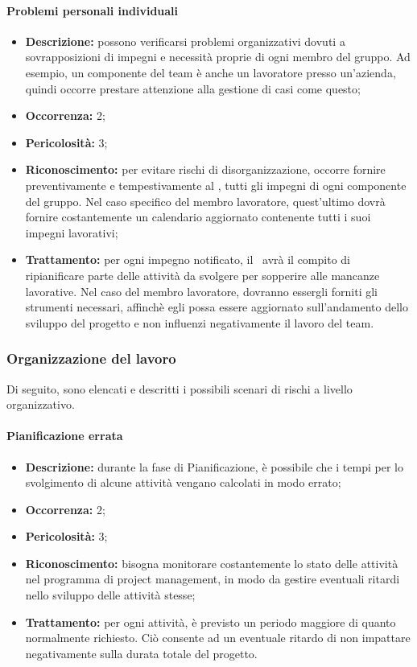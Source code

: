 \paragraph{Problemi personali individuali}
\begin{itemize}
	\item \textbf{Descrizione:} possono verificarsi problemi organizzativi dovuti a sovrapposizioni di impegni e necessità proprie di ogni membro del gruppo. Ad esempio, un componente del team è anche un lavoratore presso un'azienda, quindi occorre prestare attenzione alla gestione di casi come questo;
	\item \textbf{Occorrenza:} 2;
	\item \textbf{Pericolosità:} 3;
	\item \textbf{Riconoscimento:} per evitare rischi di disorganizzazione, occorre fornire preventivamente e tempestivamente al \textit{\Res}, tutti gli impegni di ogni componente del gruppo. Nel caso specifico del membro lavoratore, quest'ultimo dovrà fornire costantemente un calendario aggiornato contenente tutti i suoi impegni lavorativi;
	\item \textbf{Trattamento:} per ogni impegno notificato, il \textit{\Res}\ avrà il compito di ripianificare parte delle attività da svolgere per sopperire alle mancanze lavorative. Nel caso del membro lavoratore, dovranno essergli forniti gli strumenti necessari, affinchè egli possa essere aggiornato sull'andamento dello sviluppo del progetto e non influenzi negativamente il lavoro del team.
\end{itemize}

\subsubsection{Organizzazione del lavoro}

Di seguito, sono elencati e descritti i possibili scenari di rischi a livello organizzativo.

\paragraph{Pianificazione errata}
\begin{itemize}
	\item \textbf{Descrizione:} durante la fase di Pianificazione, è possibile che i tempi per lo svolgimento di alcune attività vengano calcolati in modo errato;
	\item \textbf{Occorrenza:} 2;
	\item \textbf{Pericolosità:} 3;
	\item \textbf{Riconoscimento:} bisogna monitorare costantemente lo stato delle attività nel programma di project management, in modo da gestire eventuali ritardi nello sviluppo delle attività stesse;
	\item \textbf{Trattamento:} per ogni attività, è previsto un periodo maggiore di quanto normalmente richiesto. Ciò consente ad un eventuale ritardo di non impattare negativamente sulla durata totale del progetto.
\end{itemize}

